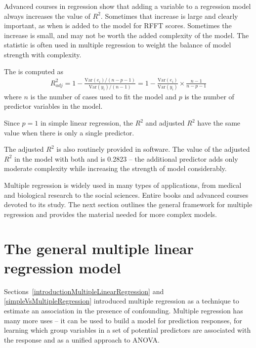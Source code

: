 Advanced courses in regression show that adding a variable to a regression model always increases the value of $R^2$.  Sometimes that increase is large and clearly important, as when  is added to the model for RFFT scores.  Sometimes the increase is small, and may not be worth the added complexity of the model.  The statistic  is often used in multiple regression to weight the balance of model strength with complexity.

\begin{termBox}{
The  is computed as
\begin{align*}
R_{adj}^{2} = 1-\frac{\text{Var}(e_i) / (n-p-1)}{\text{Var}(y_i) / (n-1)}
	= 1-\frac{\text{Var}(e_i)}{\text{Var}(y_i)} \times \frac{n-1}{n-p-1}
\end{align*}
where $n$ is the number of cases used to fit the model and $p$ is the number of predictor variables in the model.}
\end{termBox}

Since $p = 1$ in simple linear regression, the $R^2$ and adjusted $R^2$ have the same value when there is only a single predictor.

The adjusted $R^2$ is also routinely provided in software.  The value of the adjusted $R^2$ in the model with both  and  is 0.2823 -- the additional predictor  adds only moderate complexity while increasing the strength of model considerably.


Multiple regression is widely used in many types of applications, from medical and biological research to the social sciences. Entire books and advanced courses devoted to its study.  The next section outlines the general framework for multiple regression and provides the material needed for more complex models.
 
 \section{The general multiple linear regression model}
 \label{generalMultipleRegression}
 
Sections~\ref{introductionMultipleLinearRegression} and \ref{simpleVsMultipleRegression} introduced multiple regression as a technique to estimate an association in the presence of confounding.  Multiple regression has many more uses -- it can be used to build a model for prediction responses, for learning which group variables in a set of potential predictors are associated with the response and as a unified approach to ANOVA.

